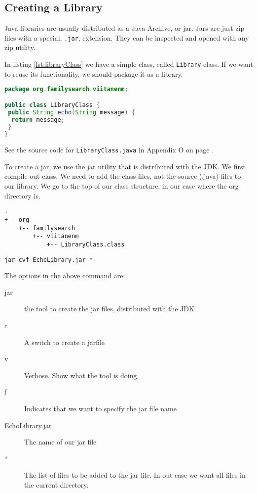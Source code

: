 \subsection{Creating a Library}

Java libraries are usually distributed as a Java Archive, or jar. Jars are just zip files with a special, \texttt{.jar}, extension. They can be inspected and opened with any zip utility.

In listing \ref{lst:libraryClass} we have a simple class, called \texttt{Library} class. If we want to reuse its functionality, we should package it as a library. 
\begin{lstlisting}[language=Java, label=lst:libraryClass, caption=Library Class]
package org.familysearch.viitanenm;

public class LibraryClass {
 public String echo(String message) {
  return message;
 }
}
\end{lstlisting}
\vspace{2em}

See the source code for \texttt{LibraryClass.java} in Appendix O on page \pageref{App:AppendixO}.

To create a jar, we use the jar utility that is distributed with the JDK. We first compile out class. We need to add the class files, not the source (.java) files to our library. We go to the top of our class structure, in our case where the org directory is.

\begin{lstlisting}
.
+-- org
    +-- familysearch
        +-- viitanenm
            +-- LibraryClass.class
\end{lstlisting}


\begin{lstlisting}
jar cvf EchoLibrary.jar *
\end{lstlisting}
The options in the above command are:
\begin{description}
\item[jar] the tool to create the jar files, distributed with the JDK
\item[c] A switch to create a jarfile
\item[v] Verbose. Show what the tool is doing
\item[f] Indicates that we want to specify the jar file name
\item[EchoLibrary.jar] The name of our jar file
\item[*] The list of files to be added to the jar file. In out case we want all files in the current directory.
\end{description}

